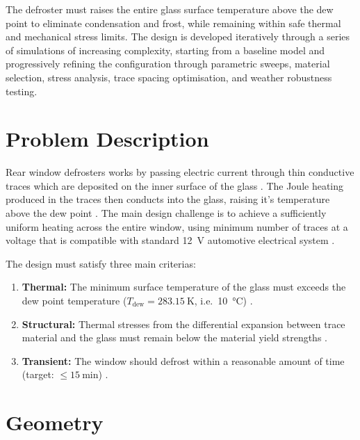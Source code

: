 The defroster must raises the entire glass surface temperature above the dew point to eliminate condensation and frost, while remaining within safe thermal and mechanical stress limits. The design is developed iteratively through a series of simulations of increasing complexity, starting from a baseline model and progressively refining the configuration through parametric sweeps, material selection, stress analysis, trace spacing optimisation, and weather robustness testing.

\section{Problem Description}
\label{sec:problem-description}

Rear window defrosters works by passing electric current through thin conductive traces which are deposited on the inner surface of the glass \cite{ruhl2016}. The Joule heating produced in the traces then conducts into the glass, raising it's temperature above the dew point \cite{koshlak2024}. The main design challenge is to achieve a sufficiently uniform heating across the entire window, using minimum number of traces at a voltage that is compatible with standard \SI{12}{\volt} automotive electrical system \cite{bosch2014}.

The design must satisfy three main criterias:
\begin{enumerate}
    \item \textbf{Thermal:} The minimum surface temperature of the glass must exceeds the dew point temperature ($T_\text{dew} = \SI{283.15}{\kelvin}$, i.e.\ \SI{10}{\degreeCelsius}) \cite{lawrence2005}.
    \item \textbf{Structural:} Thermal stresses from the differential expansion between trace material and the glass must remain below the material yield strengths \cite{ruhl2016}.
    \item \textbf{Transient:} The window should defrost within a reasonable amount of time (target: $\leq \SI{15}{\minute}$) \cite{prudenziati2012}.
\end{enumerate}


\section{Geometry}
\label{sec:geometry}


